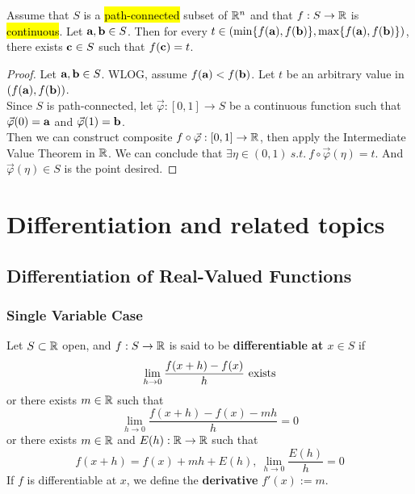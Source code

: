 \documentclass[11pt]{article}
\begin{document}
			\begin{theorem}
				Assume that $S$ is a \hl{path-connected} subset of $\mathbb{R}^n$ and that $f: S \to \mathbb{R}$ is \hl{continuous}. Let $\textbf{a}, \textbf{b} \in S$.
				Then for every $t \in (\min\{f(\textbf{a}), f(\textbf{b})\}, \max\{f(\textbf{a}), f(\textbf{b})\})$, there exists $\textbf{c} \in S$ such that $f(\textbf{c}) = t$.
				\begin{proof}
					Let $\textbf{a}, \textbf{b} \in S$. WLOG, assume $f(\textbf{a}) < f(\textbf{b})$. Let $t$ be an arbitrary value in $(f(\textbf{a}), f(\textbf{b}))$.\\
					Since $S$ is path-connected, let $\vec{\varphi}: [0, 1] \to S$ be a continuous function such that $\vec{\varphi}(0) = \textbf{a}$ and $\vec{\varphi}(1) = \textbf{b}$. \\
					Then we can construct composite $f \circ \vec{\varphi}: [0, 1] \to \mathbb{R}$, then apply the Intermediate Value Theorem in $\mathbb{R}$. We can conclude that $\exists \eta \in (0,1)\ s.t.\ f \circ \vec{\varphi}(\eta) = t$. And $\vec{\varphi}(\eta) \in S$ is the point desired.
				\end{proof}
			\end{theorem}
			
	\section{Differentiation and related topics}
		\subsection{Differentiation of Real-Valued Functions}
			\subsubsection{Single Variable Case}
				\begin{definition}
					Let $S \subset \mathbb{R}$ open, and $f: S \to \mathbb{R}$ is said to be \textbf{differentiable at $x \in S$} if 
					\begin{equation}
						\lim_{h \to 0} \frac{f(x+h) - f(x)}{h} \text{{ exists}}
					\end{equation}
					or there exists $m \in \mathbb{R}$ such that
					\begin{equation}
						\lim_{h \to 0} \frac{f(x+h) - f(x) - mh}{h} = 0
					\end{equation}
					or there exists $m \in \mathbb{R}$ and $E(h): \mathbb{R} \to \mathbb{R}$ such that
					\begin{equation}
						f(x+h) = f(x) + mh + E(h),\ \lim_{h \to 0} \frac{E(h)}{h} = 0
					\end{equation}
					If $f$ is differentiable at $x$, we define the \textbf{derivative} $f'(x) := m$.
				\end{definition}
			
\end{document}
